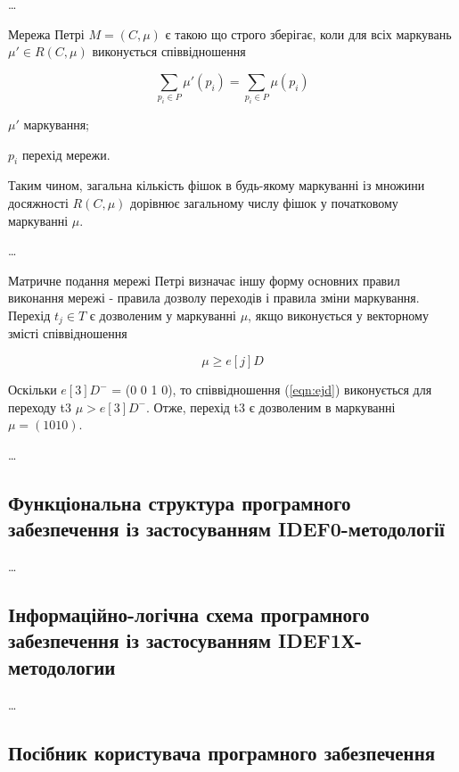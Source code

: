 …

Мережа Петрі $M = (C, \mu)$ є такою що строго зберігає, коли для всіх маркувань
$\mu' \in R(C, \mu)$ виконується співвідношення

\begin{equation}
\sum_{p_i \in P}{\mu'(p_i)}=\sum_{p_i \in P}{\mu(p_i)}
\end{equation}

\begin{formulaDescription}
\item[$\mu'$] маркування;
\item[$p_i$] перехід мережи.
\end{formulaDescription}

Таким чином, загальна кількість фішок в будь-якому маркуванні із множини
досяжності $R(C, \mu)$ дорівнює загальному числу фішок у початковому маркуванні
$\mu$.

…

Матричне подання мережі Петрі визначає іншу форму основних правил виконання
мережі - правила дозволу переходів і правила зміни маркування. Перехід $t_j \in 
T$ є дозволеним у маркуванні $\mu$, якщо виконується у векторному змісті
співвідношення

\begin{equation}\label{eqn:ejd}
\mu \geq e[j] D
\end{equation}

Оскільки $e[3] D^{-}$ = (0 0 1 0), то співвідношення (\ref{eqn:ejd}) виконується
для переходу t3 $\mu > e[3] D^{-}$. Отже, перехід t3 є дозволеним в
маркуванні $\mu = ( 1 0 1 0 )$.

…

\subsection{Функціональна структура програмного забезпечення із застосуванням
IDEF0-методології}

…

\subsection{Інформаційно-логічна схема програмного забезпечення із застосуванням
IDEF1Х-методологии}

…

\subsection{Посібник користувача програмного забезпечення}

